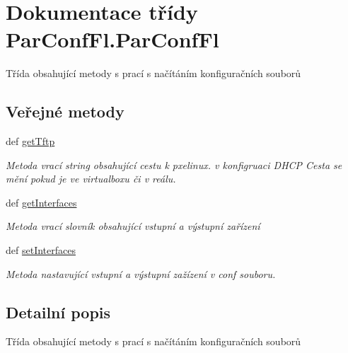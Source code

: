 \hypertarget{classParConfFl_1_1ParConfFl}{\section{Dokumentace třídy Par\-Conf\-Fl.\-Par\-Conf\-Fl}
\label{d4/d51/classParConfFl_1_1ParConfFl}
}


Třída obsahující metody s prací s načítáním konfiguračních souborů  


\subsection*{Veřejné metody}
\begin{DoxyCompactItemize}
\item 
def \hyperlink{classParConfFl_1_1ParConfFl_a4d415b4a08096b6f12663baabdd7b5bb}{get\-Tftp}
\begin{DoxyCompactList}\small\item\em Metoda vrací string obsahující cestu k pxelinux. v konfigruaci D\-H\-C\-P Cesta se mění pokud je ve virtualboxu či v reálu. \end{DoxyCompactList}\item 
def \hyperlink{classParConfFl_1_1ParConfFl_a6f8c18c2f4d356b96006776632046d3a}{get\-Interfaces}
\begin{DoxyCompactList}\small\item\em Metoda vrací slovník obsahující vstupní a výstupní zařízení \end{DoxyCompactList}\item 
def \hyperlink{classParConfFl_1_1ParConfFl_a7e383320951353baedfe4815174fae1c}{set\-Interfaces}
\begin{DoxyCompactList}\small\item\em Metoda nastavující vstupní a výstupní zažízení v conf souboru. \end{DoxyCompactList}\end{DoxyCompactItemize}


\subsection{Detailní popis}
Třída obsahující metody s prací s načítáním konfiguračních souborů 

